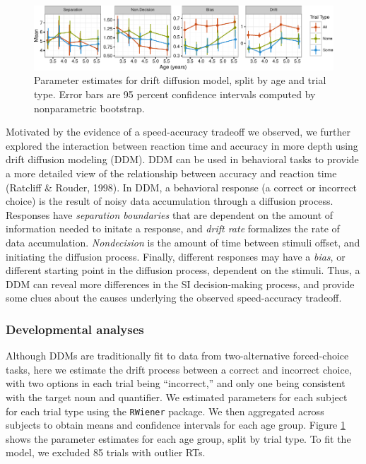 \documentclass[10pt, letterpaper]{article}
\newenvironment{CodeChunk}{}{}
\begin{document}
\begin{CodeChunk}
\begin{figure}[t]

{\centering \includegraphics{figs/devo_param_plot-1} 

}

\caption[Parameter estimates for drift diffusion model, split by age and trial type]{Parameter estimates for drift diffusion model, split by age and trial type. Error bars are 95 percent confidence intervals computed by nonparametric bootstrap.}\label{fig:devo_param_plot}
\end{figure}
\end{CodeChunk}

Motivated by the evidence of a speed-accuracy tradeoff we observed, we
further explored the interaction between reaction time and accuracy in
more depth using drift diffusion modeling (DDM). DDM can be used in
behavioral tasks to provide a more detailed view of the relationship
between accuracy and reaction time (Ratcliff \& Rouder, 1998). In DDM, a
behavioral response (a correct or incorrect choice) is the result of
noisy data accumulation through a diffusion process. Responses have
\emph{separation boundaries} that are dependent on the amount of
information needed to initate a response, and \emph{drift rate}
formalizes the rate of data accumulation. \emph{Nondecision} is the
amount of time between stimuli offset, and initiating the diffusion
process. Finally, different responses may have a \emph{bias}, or
different starting point in the diffusion process, dependent on the
stimuli. Thus, a DDM can reveal more differences in the SI
decision-making process, and provide some clues about the causes
underlying the observed speed-accuracy tradeoff.

\subsubsection{Developmental analyses}\label{developmental-analyses}

Although DDMs are traditionally fit to data from two-alternative
forced-choice tasks, here we estimate the drift process between a
correct and incorrect choice, with two options in each trial being
``incorrect,'' and only one being consistent with the target noun and
quantifier. We estimated parameters for each subject for each trial type
using the \texttt{RWiener} package. We then aggregated across subjects
to obtain means and confidence intervals for each age group. Figure
\ref{fig:devo_param_plot} shows the parameter estimates for each age
group, split by trial type. To fit the model, we excluded 85 trials with
outlier RTs.
\end{document}
